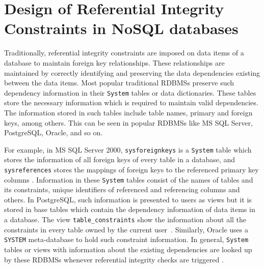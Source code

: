 \chapter{Design of Referential Integrity Constraints in NoSQL
databases} \label{c:solutions}

Traditionally,  referential
integrity constraints are imposed on data items of a database to maintain
foreign key relationships.   These relationships are
 maintained by correctly identifying and preserving the data dependencies 
 existing between the data items.  
Most popular traditional \acp{RDBMS}
preserve such dependency information in their \texttt{System} tables or data
dictionaries.    These tables store the necessary information  which is required
to maintain valid dependencies.   The information stored in such tables include table
names,   primary and foreign keys, among others.  
This can be seen in popular \acp{RDBMS} like  MS SQL Server,   PostgreSQL, 
Oracle,  and so on.    

For example,   in MS SQL Server 2000,  \texttt{sysforeignkeys}
is a \texttt{System} table which stores the information of all 
foreign keys of every table in a database,  and \texttt{sysreferences}
stores the mappings of  foreign keys to the referenced primary key columns
\citep{msdn}.  
Information in these \texttt{System} tables consist of  the
names of tables and its constraints,   unique identifiers of 
referenced and referencing columns and others.   
In PostgreSQL,  such information is presented to users as views but it is stored
in base tables which contain the dependency information of data items in a database. 
The view \texttt{table\_constraints} show the information about all the
constraints in every table owned by the current user~\citep{postgres}.   
Similarly,  Oracle uses a \texttt{SYSTEM} meta-database to hold such constraint
information.  
 In general,  \texttt{System} tables or views with information
about the existing dependencies  are looked up by these \acp{RDBMS} whenever
referential integrity checks are triggered \citep{msdn}.  


